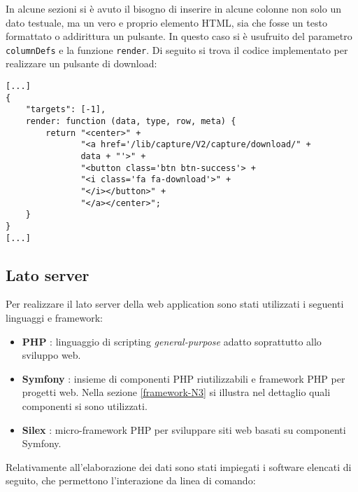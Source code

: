 In alcune sezioni si è avuto il bisogno di inserire in alcune colonne non solo un dato testuale, ma un vero e proprio elemento HTML, sia che fosse un testo formattato o addirittura un pulsante. In questo caso si è usufruito del parametro \texttt{columnDefs} e la funzione \texttt{render}. Di seguito si trova il codice implementato per realizzare un pulsante di download:

\begin{lstlisting}[style=JavaScript,caption={Realizzazione del pulsante di download nella DataTable della sezione \ref{sezione-capture-stack}.},captionpos=b]
[...]
{
    "targets": [-1],
    render: function (data, type, row, meta) {
        return "<center>" + 
               "<a href='/lib/capture/V2/capture/download/" + 
               data + "'>" + 
               "<button class='btn btn-success'> +
               "<i class='fa fa-download'>" +
               "</i></button>" +
               "</a></center>";
    }
}
[...]
\end{lstlisting}

\subsection{Lato server}

Per realizzare il lato server della web application sono stati utilizzati i seguenti linguaggi e framework:

\begin{itemize}

    \item \textbf{PHP} \cite{PHP}: linguaggio di scripting \emph{general-purpose} adatto soprattutto allo sviluppo web. 
    
    \item \textbf{Symfony} \cite{Symfony}: insieme di componenti PHP riutilizzabili e framework PHP per progetti web. Nella sezione \ref{framework-N3} si illustra nel dettaglio quali componenti si sono utilizzati.
    
    \item \textbf{Silex} \cite{Silex}: micro-framework PHP per sviluppare siti web basati su componenti Symfony.
    
\end{itemize}

\noindent Relativamente all'elaborazione dei dati sono stati impiegati i software elencati di seguito, che permettono l'interazione da linea di comando: 

